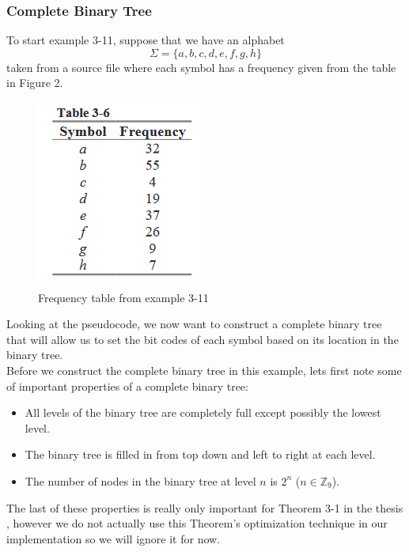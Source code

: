 \documentclass[12pt]{IEEEtran}
\begin{document}
\subsubsection{Complete Binary Tree} 
To start example 3-11, suppose that we have an alphabet 
\[\Sigma = \{a,b,c,d,e,f,g,h\}\]
taken from a source file where each symbol has a frequency
given from the table in Figure 2.
\begin{figure}
\centering
\includegraphics[scale=0.60]{../presentation/images/frequencytable.PNG}
\caption{Frequency table from example 3-11 \cite{Sjostrand}}
\end{figure}
Looking at the pseudocode, we now want to construct a complete binary tree that will allow us to set the bit codes of each
symbol based on its location in the binary tree. \\

Before we construct the complete binary tree in this example, lets first note some of
important properties of a complete binary tree:
\begin{itemize}
\item All levels of the binary tree are completely full except possibly the lowest level.
\item The binary tree is filled in from top down and left to right at each level.
\item The number of nodes in the binary tree at level $n$ is $2^n$ ($n \in \mathbb{Z}_9$).
\end{itemize}
The last of these properties is really only important for Theorem 3-1 in the thesis \cite{Sjostrand}, however we do not actually use
this Theorem's optimization technique in our implementation so we will ignore it for now. \\
\end{document}
